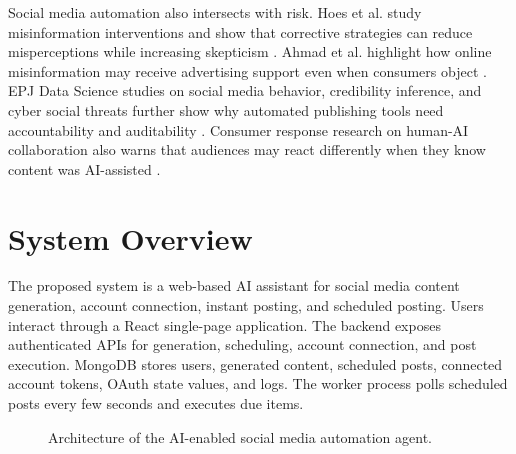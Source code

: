 \documentclass[conference]{IEEEtran}
\begin{document}
Social media automation also intersects with risk. Hoes et al. study misinformation interventions and show that corrective strategies can reduce misperceptions while increasing skepticism \cite{hoes2024}. Ahmad et al. highlight how online misinformation may receive advertising support even when consumers object \cite{ahmad2024}. EPJ Data Science studies on social media behavior, credibility inference, and cyber social threats further show why automated publishing tools need accountability and auditability \cite{nwala2023,truong2024,pierri2024,jeon2025}. Consumer response research on human-AI collaboration also warns that audiences may react differently when they know content was AI-assisted \cite{haupt2025}.

\section{System Overview}
The proposed system is a web-based AI assistant for social media content generation, account connection, instant posting, and scheduled posting. Users interact through a React single-page application. The backend exposes authenticated APIs for generation, scheduling, account connection, and post execution. MongoDB stores users, generated content, scheduled posts, connected account tokens, OAuth state values, and logs. The worker process polls scheduled posts every few seconds and executes due items.

\begin{figure}[!t]
\centering
{}
\caption{Architecture of the AI-enabled social media automation agent.}
\label{fig:architecture}
\end{figure}
\end{document}
